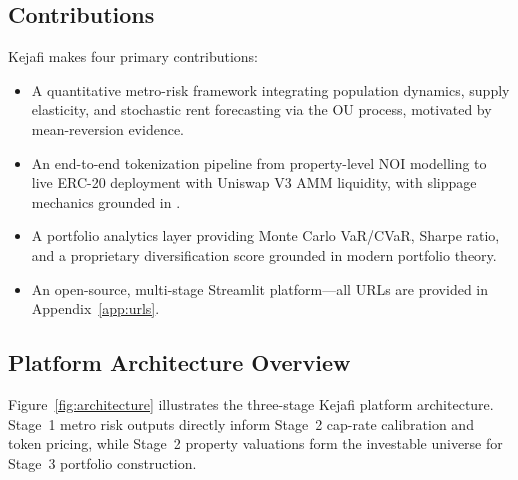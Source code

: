 \documentclass[11pt,letterpaper]{article}
\begin{document}
\subsection{Contributions}

Kejafi makes four primary contributions:

\begin{itemize}[leftmargin=2em]
  \item A quantitative metro-risk framework integrating \citet{glaeser2018} population
  dynamics, \citet{saiz2010} supply elasticity, and stochastic rent forecasting via the
  \citet{vasicek1977} OU process, motivated by \citet{case1989} mean-reversion evidence.
  \item An end-to-end tokenization pipeline from property-level NOI modelling to live ERC-20
  deployment with Uniswap V3 AMM liquidity, with slippage mechanics grounded in
  \citet{angeris2020}.
  \item A portfolio analytics layer providing Monte Carlo VaR/CVaR, Sharpe ratio, and a
  proprietary diversification score grounded in modern portfolio theory.
  \item An open-source, multi-stage Streamlit platform---all URLs are provided in
  Appendix~\ref{app:urls}.
\end{itemize}

\subsection{Platform Architecture Overview}

Figure~\ref{fig:architecture} illustrates the three-stage Kejafi platform architecture.
Stage~1 metro risk outputs directly inform Stage~2 cap-rate calibration and token pricing,
while Stage~2 property valuations form the investable universe for Stage~3 portfolio
construction.
\end{document}
